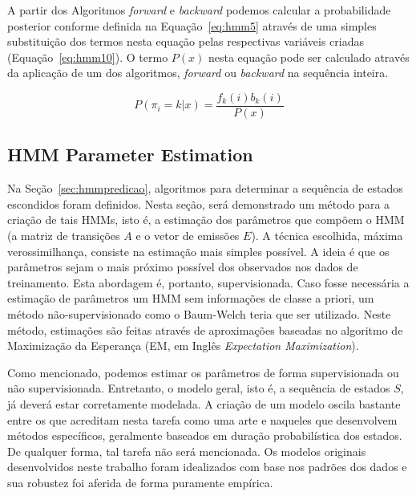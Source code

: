 A partir dos Algoritmos \emph{forward} e \emph{backward} podemos calcular a probabilidade posterior conforme definida na Equação~\ref{eq:hmm5} através de uma simples substituição dos termos nesta equação pelas respectivas variáveis criadas (Equação~\ref{eq:hmm10}). O termo $ P(x) $ nesta equação pode ser calculado através da aplicação de um dos algoritmos, \emph{forward} ou \emph{backward} na sequência inteira.

\begin{equation}\label{eq:hmm10}
    P(\pi_i = k | x) = \frac{f_k(i) b_k(i)}{P(x)} 
\end{equation}

\subsection{HMM Parameter Estimation}
\label{sec:hmm.parameter.estimation}

Na Seção~\ref{sec:hmmpredicao}, algoritmos para determinar a sequência de estados escondidos foram definidos. Nesta seção, será demonstrado um método para a criação de tais HMMs, isto é, a estimação dos parâmetros que compõem o HMM (a matriz de transições $ A $ e o vetor de emissões $ E $). A técnica escolhida, máxima verossimilhança, consiste na estimação mais simples possível. A ideia é que os parâmetros sejam o mais próximo possível dos observados nos dados de treinamento. Esta abordagem é, portanto, supervisionada. Caso fosse necessária a estimação de parâmetros um HMM sem informações de classe a priori, um método não-supervisionado como o Baum-Welch teria que ser utilizado. Neste método, estimações são feitas através de aproximações baseadas no algoritmo de Maximização da Esperança (EM, em Inglês \emph{Expectation Maximization}).

Como mencionado, podemos estimar os parâmetros de forma supervisionada ou não supervisionada. Entretanto, o modelo geral, isto é, a sequência de estados $ S $, já deverá estar corretamente modelada. A criação de um modelo oscila bastante entre os que acreditam nesta tarefa como uma arte e naqueles que desenvolvem métodos específicos, geralmente baseados em duração probabilística dos estados. De qualquer forma, tal tarefa não será mencionada. Os modelos originais desenvolvidos neste trabalho foram idealizados com base nos padrões dos dados e sua robustez foi aferida de forma puramente empírica.

